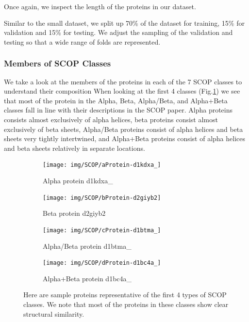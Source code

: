 \documentclass[12pt, a4paper, twocolumn, fullpage]{article}
\theoremstyle{plain}
\theoremstyle{definition}
\theoremstyle{remark}
\begin{document}
Once again, we inspect the length of the proteins in our dataset.

Similar to the small dataset, we split up 70\% of the dataset for training, 15\% for validation and 15\% for testing. We adjust the sampling of the validation and testing so that a wide range of folds are represented.

\subsubsection{Members of SCOP Classes}

We take a look at the members of the proteins in each of the 7 SCOP classes to understand their composition When looking at the first 4 classes (Fig.\ref{fig:SCOPClass-abcd}) we see that most of the protein in the Alpha, Beta, Alpha/Beta, and Alpha+Beta classes fall in line with their descriptions in the SCOP paper. Alpha proteins consists almost exclusively of alpha helices, beta proteins consist almost exclusively of beta sheets, Alpha/Beta proteins consist of alpha helices and beta sheets very tightly intertwined, and Alpha+Beta proteins consist of alpha helices and beta sheets relatively in separate locations.

\begin{figure}[t]
\centering
\begin{subfigure}{.5\textwidth}
  \centering
  \texttt{[image: img/SCOP/aProtein-d1kdxa\_]}
  \caption{Alpha protein d1kdxa\_}
\end{subfigure}%
\begin{subfigure}{.5\textwidth}
  \centering
  \texttt{[image: img/SCOP/bProtein-d2giyb2]}
  \caption{Beta protein d2giyb2}
\end{subfigure}
\begin{subfigure}{.5\textwidth}
  \centering
  \texttt{[image: img/SCOP/cProtein-d1btma\_]}
  \caption{Alpha/Beta protein d1btma\_}
\end{subfigure}%
\begin{subfigure}{.5\textwidth}
  \centering
  \texttt{[image: img/SCOP/dProtein-d1bc4a\_]}
  \caption{Alpha+Beta protein d1bc4a\_}
\end{subfigure}%
\caption{Here are sample proteins representative of the first 4 types of SCOP classes. We note that most of the proteins in these classes show clear structural similarity.}
\label{fig:SCOPClass-abcd}
\end{figure}
\end{document}
